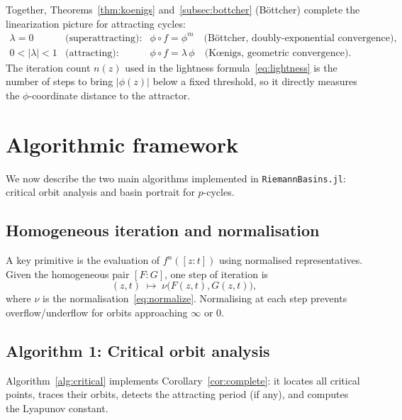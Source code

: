 \documentclass[12pt]{article}
\theoremstyle{definition}
\newcommand{\hpair}{[F:G]}
\begin{document}
Together, Theorems~\ref{thm:koenigs} and~\ref{subsec:bottcher} (Böttcher)
complete the linearization picture for attracting cycles:
\[
  \begin{array}{rll}
    \lambda=0 & \text{(superattracting):} & \phi\circ f = \phi^m
                \quad\text{(Böttcher, doubly-exponential convergence),}\\
    0<|\lambda|<1 & \text{(attracting):} & \phi\circ f = \lambda\,\phi
                \quad\text{(Kœnigs, geometric convergence).}
  \end{array}
\]
The iteration count $n(z)$ used in the lightness formula~\eqref{eq:lightness}
is the number of steps to bring $|\phi(z)|$ below a fixed threshold, so it
directly measures the $\phi$-coordinate distance to the attractor.

\section{Algorithmic framework}
\label{sec:algorithms}

We now describe the two main algorithms implemented in
\texttt{RiemannBasins.jl}: critical orbit analysis and basin portrait
for $p$-cycles.

\subsection{Homogeneous iteration and normalisation}

A key primitive is the evaluation of $f^n([z:t])$ using normalised
representatives.  Given the homogeneous pair $\hpair$, one step of
iteration is
\begin{equation}\label{eq:iterate}
  (z,t)\;\longmapsto\;\nu\bigl(F(z,t),G(z,t)\bigr),
\end{equation}
where $\nu$ is the normalisation~\eqref{eq:normalize}.  Normalising at
each step prevents overflow/underflow for orbits approaching $\infty$
or $0$.

\subsection{Algorithm 1: Critical orbit analysis}

Algorithm~\ref{alg:critical} implements Corollary~\ref{cor:complete}:
it locates all critical points, traces their orbits, detects the
attracting period (if any), and computes the Lyapunov constant.
\end{document}
